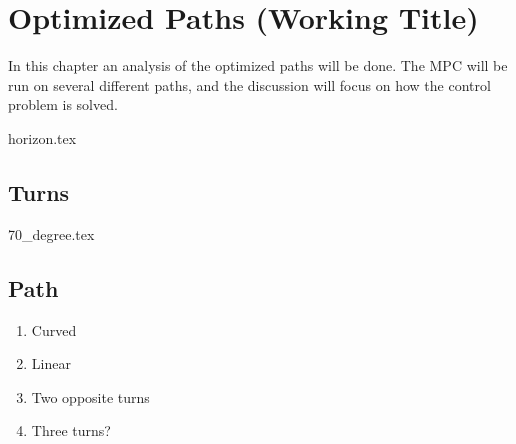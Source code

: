\chapter{Optimized Paths (Working Title)}


In this chapter an analysis of the optimized paths will be done. The MPC will be run on several different paths, and the discussion will focus on how the control problem is solved.

{horizon.tex}

\section{Turns}
{70_degree.tex}


\section{Path}

\begin{enumerate}
	\item Curved
	\item Linear
	\item Two opposite turns
	\item Three turns?
\end{enumerate}


